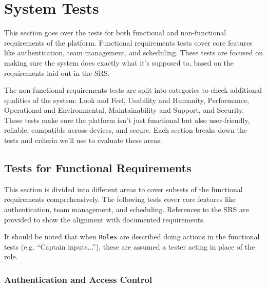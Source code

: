 \documentclass[12pt, titlepage]{article}
\begin{document}



\section{System Tests}

This section goes over the tests for both functional and non-functional requirements of the platform. Functional requirements tests cover core features like authentication, team management, and scheduling. These tests are focused on making sure the system does exactly what it’s supposed to, based on the requirements laid out in the SRS.

The non-functional requirements tests are split into categories to check additional qualities of the system: Look and Feel, Usability and Humanity, Performance, Operational and Environmental, Maintainability and Support, and Security. These tests make sure the platform isn’t just functional but also user-friendly, reliable, compatible across devices, and secure. Each section breaks down the tests and criteria we’ll use to evaluate these areas.

\subsection{Tests for Functional Requirements}

This section is divided into different areas to cover subsets of the functional requirements comprehensively. The following tests cover core features like authentication, team management, and scheduling. References to the SRS are provided to show the alignment with documented requirements.

It should be noted that when \texttt{Roles} are described doing actions in the functional tests (e.g. ``Captain inputs...''), these are assumed a tester acting in place of the role.

\subsubsection{Authentication and Access Control}
\end{document}
